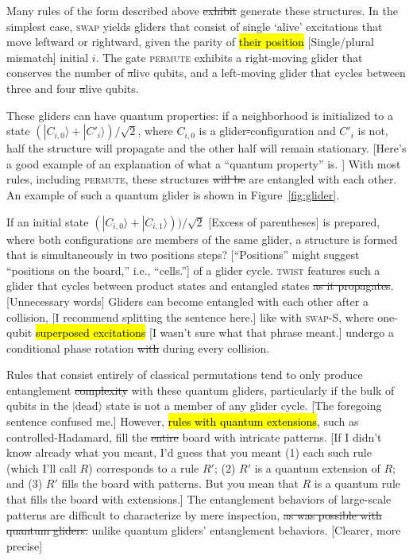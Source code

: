 \documentclass[11pt]{article}
\newcommand{\nicole}[1]{{\color{Green}#1}}
\begin{document}
\begin{multicols}{2}
Many rules of the form described above \sout{exhibit} \nicole{generate} these structures. In the simplest case, \textsc{swap} yields gliders that consist of single `alive' excitations that move left\nicole{ward} or right\nicole{ward,} given the parity of 
\hl{their position} \nicole{[Single/plural mismatch]} \nicole{initial} $i$. The gate \textsc{permute} exhibits a right-moving glider that conserves \nicole{the} number of \sout{a}live qubits, and a left\nicole{-}moving glider that cycles between three and four \sout{a}live qubits.





These gliders can have quantum properties: if a neighborhood is initialized to a state $(|C_{i,0}\rangle + |C'_{i}\rangle)/\sqrt{2}$\nicole{,} where $C_{i,0}$ is a glider\sout{-}configuration and $C'_i$ is not, half the structure will propagate and the other half will remain stationary. 
\nicole{[Here's a good example of an explanation of what a ``quantum property'' is. \checkmark]}
With most rules, including \textsc{permute}, these structures \sout{will be} \nicole{are} entangled with each other. An example of such a quantum glider is shown in Figure~\ref{fig:glider}.



If an initial state $(|C_{i,0}\rangle + |C_{i,1}\rangle))/\sqrt{2} $ 
\nicole{[Excess of parentheses]}
is prepared, where both configurations are members of the same glider, a structure is formed that is simultaneously in two positions \nicole{steps? [``Positions'' might suggest ``positions on the board,'' i.e., ``cells.'']} of a glider cycle. \textsc{twist} features such a glider that cycles between product states and entangled states\sout{ as it propagates}. \nicole{[Unnecessary words]} Gliders can become entangled with each other after a collision, 
\nicole{[I recommend splitting the sentence here.]}
like with \textsc{swap-S}\nicole{,} where one-qubit \hl{superposed excitations} 
\nicole{[I wasn't sure what that phrase meant.]}
undergo a conditional phase rotation \sout{with} \nicole{during} every collision.



Rules that consist entirely of classical permutations tend to only produce entanglement \sout{complexity} with these quantum gliders, particularly if the bulk of qubits in the $|$dead$\rangle$ state is not a member of any glider cycle.
\nicole{[The foregoing sentence confused me.]}
However, \hl{rules with quantum extensions}\nicole{,} such as controlled-Hadamard\nicole{,} fill the \sout{entire} board with intricate patterns. 
\nicole{[If I didn't know already what you meant, I'd guess that you meant (1) each such rule (which I'll call $R$) corresponds to a rule $R'$; (2) $R'$ is a quantum extension of $R$; and (3) $R'$ fills the board with patterns. But you mean that $R$ is a quantum rule that fills the board with extensions.]}
The entanglement behaviors of large-scale patterns are difficult to characterize by mere inspection, \sout{as was possible with quantum gliders.}
\nicole{unlike quantum gliders' entanglement behaviors}. \nicole{[Clearer, more precise]}


\end{multicols}
\end{document}
